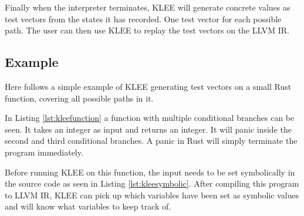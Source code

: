 Finally when the interpreter terminates, KLEE will generate concrete values as
test vectors from the states it has recorded. One test vector for each possible
path. The user can then use KLEE to replay the test vectors on the LLVM IR.

\subsection{Example}
Here follows a simple example of KLEE generating test vectors on a small Rust
function, covering all possible paths in it.

In Listing \ref{lst:kleefunction} a function with multiple conditional branches
can be seen. It takes an integer as input and returns an integer.  It will
panic inside the second and third conditional branches. A panic in Rust will
simply terminate the program immediately.


Before running KLEE on this function, the input needs to be set symbolically in
the source code as seen in Listing \ref{lst:kleesymbolic}. After compiling this
program to LLVM IR, KLEE can pick up which variables have been set as symbolic
values and will know what variables to keep track of.


